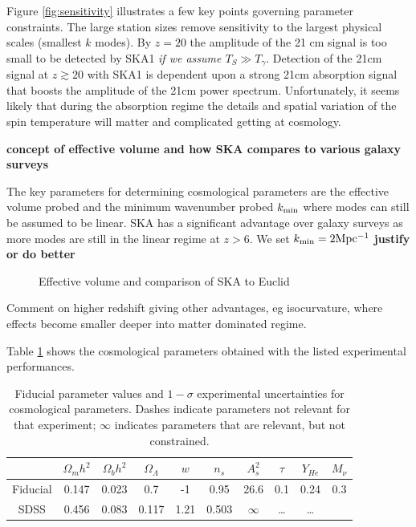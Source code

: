 \documentclass{PoS}
\begin{document}
Figure \ref{fig:sensitivity} illustrates a few key points governing parameter constraints. The large station sizes remove sensitivity to the largest physical scales (smallest $k$ modes). By $z=20$ the amplitude of the 21 cm signal is too small to be detected by SKA1 {\em if we assume $T_S\gg T_\gamma$}. Detection of the 21cm signal at $z\gtrsim20$ with SKA1 is dependent upon a strong 21cm absorption signal that boosts the amplitude of the 21cm power spectrum. Unfortunately, it seems likely that during the absorption regime the details and spatial variation of the spin temperature will matter and complicated getting at cosmology.

{\bf concept of effective volume and how SKA compares to various galaxy surveys}

The key parameters for determining cosmological parameters are the effective volume probed and the minimum wavenumber probed $k_{\rm min}$ where modes can still be assumed to be linear. SKA has a significant advantage over galaxy surveys as more modes are still in the linear regime at $z>6$. We set $k_{\rm min}=2{\rm Mpc^{-1}}$ {\bf justify or do better}

\begin{figure}[htbp]
\begin{center}

\caption{Effective volume and comparison of SKA to Euclid}
\label{fig:effectivevolume}
\end{center}
\end{figure}

Comment on higher redshift giving other advantages, eg isocurvature, where effects become smaller deeper into matter dominated regime.

Table \ref{tab:constraints} shows the cosmological parameters obtained with the listed experimental performances.

\begin{table}[htdp]
\caption{Fiducial parameter values and $1-\sigma$ experimental uncertainties for cosmological parameters.  Dashes indicate parameters not relevant for that experiment; $\infty$ indicates parameters that are relevant, but not constrained. }
\begin{center}
\begin{tabular}{c|cccccccc|c}
\hline
& $\Omega_mh^2$ & $\Omega_bh^2$ & $\Omega_\Lambda$ & $w$ & $n_s$ & $A^2_s$ & $\tau$ & $Y_{He}$  & $M_\nu$ \\
\hline
Fiducial& 0.147 & 0.023 & 0.7 & -1 & 0.95 & 26.6 & 0.1 & 0.24 & 0.3  \\
\hline
SDSS& 0.456 & 0.083 & 0.117 & 1.21 & 0.503 & $\infty$ & \ldots & \ldots   \\
\end{tabular}
\end{center}
\label{tab:constraints}
\end{table}
\end{document}
